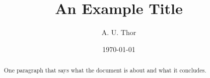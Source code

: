 \documentclass[11pt,a4paper]{article}
\title{An Example Title}
\author{A. U. Thor}
\date{\today}
\begin{document}
\maketitle

\begin{abstract}
One paragraph that says what the document is about and what it concludes.
\end{abstract}






\end{document}
